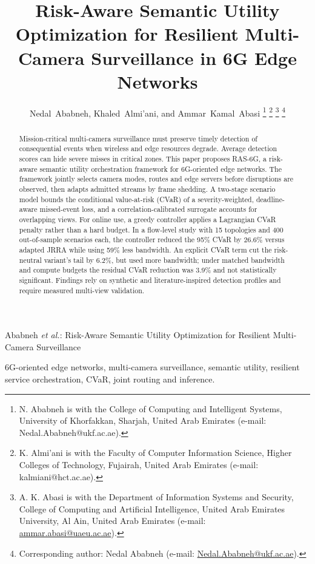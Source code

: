 \documentclass[letterpaper,journal]{IEEEtran}
\begin{document}
%
{Ababneh \MakeLowercase{\textit{et al.}}: Risk-Aware Semantic Utility Optimization for Resilient Multi-Camera Surveillance}
\title{Risk-Aware Semantic Utility Optimization for Resilient Multi-Camera Surveillance in 6G Edge Networks}
\author{Nedal~Ababneh, Khaled~Almi'ani, and Ammar~Kamal~Abasi%
\thanks{N. Ababneh is with the College of Computing and Intelligent Systems, University of Khorfakkan, Sharjah, United Arab Emirates (e-mail: Nedal.Ababneh@ukf.ac.ae).}%
\thanks{K. Almi'ani is with the Faculty of Computer Information Science, Higher Colleges of Technology, Fujairah, United Arab Emirates (e-mail: kalmiani@hct.ac.ae).}%
\thanks{A. K. Abasi is with the Department of Information Systems and Security, College of Computing and Artificial Intelligence, United Arab Emirates University, Al Ain, United Arab Emirates (e-mail: \href{mailto:ammar.abasi@uaeu.ac.ae}{ammar.abasi@uaeu.ac.ae}).}%
\thanks{Corresponding author: Nedal Ababneh (e-mail: \href{mailto:Nedal.Ababneh@ukf.ac.ae}{Nedal.Ababneh@ukf.ac.ae}).}%
}
\maketitle

\begin{abstract}
Mission-critical multi-camera surveillance must preserve timely detection of consequential events when wireless and edge resources degrade. Average detection scores can hide severe misses in critical zones. This paper proposes RAS-6G, a risk-aware semantic utility orchestration framework for 6G-oriented edge networks. The framework jointly selects camera modes, routes and edge servers before disruptions are observed, then adapts admitted streams by frame shedding. A two-stage scenario model bounds the conditional value-at-risk (CVaR) of a severity-weighted, deadline-aware missed-event loss, and a correlation-calibrated surrogate accounts for overlapping views. For online use, a greedy controller applies a Lagrangian CVaR penalty rather than a hard budget. In a flow-level study with 15 topologies and 400 out-of-sample scenarios each, the controller reduced the 95\% CVaR by 26.6\% versus adapted JRRA while using 59\% less bandwidth. An explicit CVaR term cut the risk-neutral variant's tail by 6.2\%, but used more bandwidth; under matched bandwidth and compute budgets the residual CVaR reduction was 3.9\% and not statistically significant. Findings rely on synthetic and literature-inspired detection profiles and require measured multi-view validation.
\end{abstract}
\begin{IEEEkeywords}
6G-oriented edge networks, multi-camera surveillance, semantic utility, resilient service orchestration, CVaR, joint routing and inference.
\end{IEEEkeywords}
\end{document}
